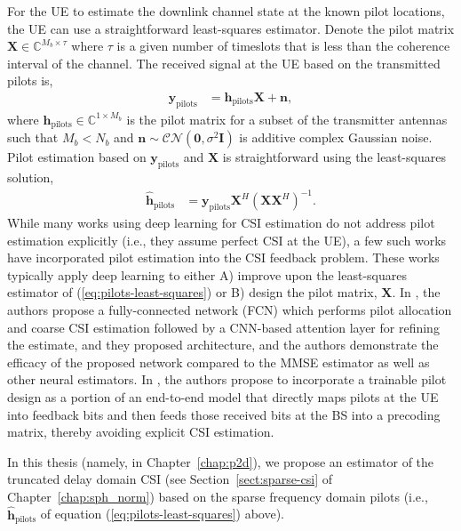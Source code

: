 For the UE to estimate the downlink channel state at the known pilot locations, the UE can use a straightforward least-squares estimator. Denote the pilot matrix $\mathbf{X}\in\mathbb{C}^{M_b \times \tau}$ where $\tau$ is a given number of timeslots that is less than the coherence interval of the channel. The received signal at the UE based on the transmitted pilots is,
\begin{align}
	\mathbf{y}_{\text{pilots}} &= \mathbf{h}_{\text{pilots}}\mathbf{X} + \mathbf{n},
\end{align}
where $\mathbf{h}_{\text{pilots}}\in\mathbb{C}^{1\times M_b}$ is the pilot matrix for a subset of the transmitter antennas such that $M_b < N_b$ and $\mathbf{n}\sim\mathcal{CN}(\mathbf{0},\sigma^2\mathbf{I})$ is additive complex Gaussian noise. Pilot estimation based on $\mathbf{y}_{\text{pilots}}$ and $\mathbf{X}$ is straightforward using the least-squares solution,
\begin{align}
	\hat{\mathbf{h}}_{\text{pilots}} &= \mathbf{y}_{\text{pilots}}\mathbf{X}^H(\mathbf{X}\mathbf{X}^H)^{-1}. \label{eq:pilots-least-squares}
\end{align}
While many works using deep learning for CSI estimation do not address pilot estimation explicitly (i.e., they assume perfect CSI at the UE), a few such works have incorporated pilot estimation into the CSI feedback problem. These works typically apply deep learning to either A) improve upon the least-squares estimator of (\ref{eq:pilots-least-squares}) or B) design the pilot matrix, $\mathbf{X}$. In \cite{ref:mashhadi2021pruning}, the authors propose a fully-connected network (FCN) which performs pilot allocation and coarse CSI estimation followed by a CNN-based attention layer for refining the estimate, and they proposed architecture, and the authors demonstrate the efficacy of the proposed network compared to the MMSE estimator as well as other neural estimators. In \cite{ref:sohrabi2021distributed}, the authors propose to incorporate a trainable pilot design as a portion of an end-to-end model that directly maps pilots at the UE into feedback bits and then feeds those received bits at the BS into a precoding matrix, thereby avoiding explicit CSI estimation.

In this thesis (namely, in Chapter~\ref{chap:p2d}), we propose an estimator of the truncated delay domain CSI (see Section~\ref{sect:sparse-csi} of Chapter~\ref{chap:sph_norm}) based on the sparse frequency domain pilots (i.e., $\hat{\mathbf{h}}_{\text{pilots}}$ of equation (\ref{eq:pilots-least-squares}) above).

